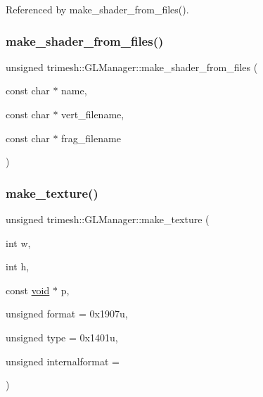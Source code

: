 Referenced by make\+\_\+shader\+\_\+from\+\_\+files().

\mbox{\label{classtrimesh_1_1GLManager_ad1a456cf2a2438927a1b02d8a861e4ab}} 
\subsubsection{\texorpdfstring{make\+\_\+shader\+\_\+from\+\_\+files()}{make\_shader\_from\_files()}}
{\footnotesize\ttfamily unsigned trimesh\+::\+G\+L\+Manager\+::make\+\_\+shader\+\_\+from\+\_\+files (\begin{DoxyParamCaption}\item[{const char $\ast$}]{name,  }\item[{const char $\ast$}]{vert\+\_\+filename,  }\item[{const char $\ast$}]{frag\+\_\+filename }\end{DoxyParamCaption})}

\mbox{\label{classtrimesh_1_1GLManager_a0130923df1836ce2861a9d52d97d0606}} 
\subsubsection{\texorpdfstring{make\+\_\+texture()}{make\_texture()}\hspace{0.1cm}{\footnotesize\ttfamily [1/2]}}
{\footnotesize\ttfamily unsigned trimesh\+::\+G\+L\+Manager\+::make\+\_\+texture (\begin{DoxyParamCaption}\item[{int}]{w,  }\item[{int}]{h,  }\item[{const \hyperlink{namespacetrimesh_a784ddfd979e1c579bda795a8edfc3f43}{void} $\ast$}]{p,  }\item[{unsigned}]{format = {\ttfamily 0x1907u},  }\item[{unsigned}]{type = {\ttfamily 0x1401u},  }\item[{unsigned}]{internalformat = {} }\end{DoxyParamCaption})}




